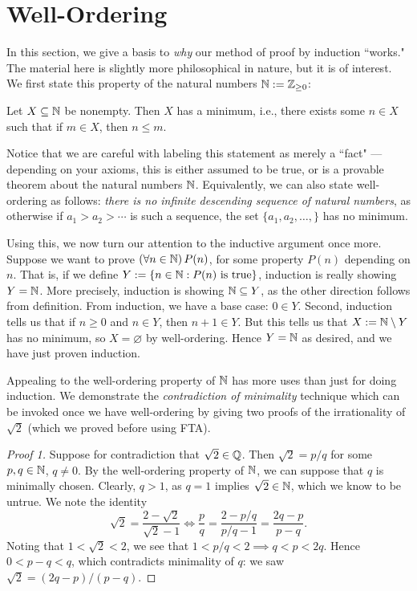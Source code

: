 \documentclass{article}
\begin{document}
\section{Well-Ordering}
In this section, we give a basis to \textit{why} our method of proof by induction ``works." The material here is slightly more philosophical in nature, but it is of interest. We first state this property of the natural numbers $\mathbb N := \mathbb Z_{\geq 0}$:

\begin{fact}
Let $X\subseteq \mathbb N$ be nonempty. Then $X$ has a minimum, i.e., there exists some $n\in X$ such that if $m\in X$, then $n \leq m$.
\end{fact}
Notice that we are careful with labeling this statement as merely a ``fact" --- depending on your axioms, this is either assumed to be true, or is a provable theorem about the natural numbers $\mathbb N$. Equivalently, we can also state well-ordering as follows: \textit{there is no infinite descending sequence of natural numbers}, as otherwise if $a_1 > a_2 > \cdots$ is such a sequence, the set $\{a_1, a_2,\ldots,\}$ has no minimum.

\newpage
Using this, we now turn our attention to the inductive argument once more. Suppose we want to prove $(\forall n\in\mathbb N) \,P(n)$, for some property $P(n)$ depending on $n$. That is, if we define $Y := \{n\in\mathbb N: P(n) \text{ is true}\}$, induction is really showing $Y = \mathbb N$. More precisely, induction is showing $\mathbb N \subseteq Y$, as the other direction follows from definition. From induction, we have a base case: $0\in Y$. Second, induction tells us that if $n \geq 0$ and $n\in Y$, then $n+1\in Y$. But this tells us that $X := \mathbb N \setminus Y$ has no minimum, so $X = \varnothing$ by well-ordering. Hence $Y = \mathbb N$ as desired, and we have just proven induction.

Appealing to the well-ordering property of $\mathbb N$ has more uses than just for doing induction. We demonstrate the \textit{contradiction of minimality} technique which can be invoked once we have well-ordering by giving two proofs of the irrationality of $\sqrt 2$ (which we proved before using FTA).
\begin{proof}[Proof 1]
Suppose for contradiction that $\sqrt 2\in\mathbb Q$. Then $\sqrt 2 = p/q$ for some $p,q\in\mathbb N$, $q\neq 0$. By the well-ordering property of $\mathbb N$, we can suppose that $q$ is minimally chosen. Clearly, $q>1$, as $q=1$ implies $\sqrt 2\in\mathbb N$, which we know to be untrue. We note the identity
$$\sqrt 2 = \frac{2-\sqrt 2}{\sqrt 2-1} \iff \frac pq = \frac{2-p/q}{p/q-1} = \frac{2q-p}{p-q}.$$
Noting that $1 < \sqrt 2 < 2$, we see that $1 < p/q < 2 \implies q < p < 2q$. Hence $0 < p-q < q$, which contradicts minimality of $q$: we saw $\sqrt 2 = (2q-p)/(p-q)$.
\end{proof}
\end{document}

